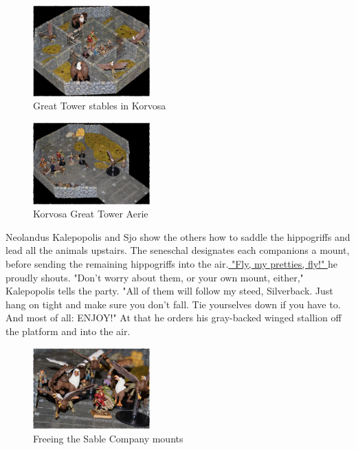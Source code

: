 \begin{figure}[h]
	\centering
	\includegraphics[width=0.4\textwidth]{images/Great-Tower-stables-in-Korvosa-567993978_mod.jpg}
	\caption{Great Tower stables in Korvosa}
	\label{fig:Great-Tower-stables-in-Korvosa-567993978}
\end{figure}

\begin{figure}[h]
	\centering
	\includegraphics[width=0.4\textwidth]{images/Korvosa-Great-Tower-Aerie-567995366_mod.jpg}
	\caption{Korvosa Great Tower Aerie}
	\label{fig:Korvosa-Great-Tower-Aerie-567995366}
\end{figure}

Neolandus Kalepopolis and Sjo show the others how to saddle the hippogriffs and lead all the animals upstairs. The seneschal designates each companions a mount, before sending the remaining hippogriffs into the air.\hyperref[fig:Freeing-the-Sable-Company-mounts-567995944]{ "Fly, my pretties, fly!" } he proudly shouts. "Don't worry about them, or your own mount, either," Kalepopolis tells the party. "All of them will follow my steed, Silverback. Just hang on tight and make sure you don't fall. Tie yourselves down if you have to. And most of all: ENJOY!" At that he orders his gray-backed winged stallion off the platform and into the air. \\

\begin{figure}[h]
	\centering
	\includegraphics[width=0.4\textwidth]{images/Freeing-the-Sable-Company-mounts-567995944_mod.jpg}
	\caption{Freeing the Sable Company mounts}
	\label{fig:Freeing-the-Sable-Company-mounts-567995944}
\end{figure}

